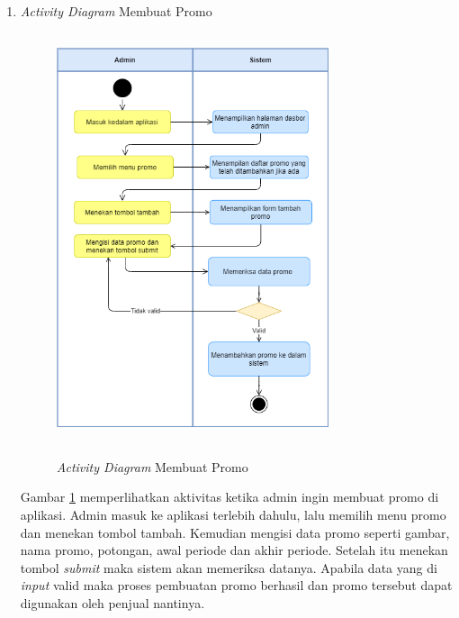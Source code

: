 \begin{enumerate}
	\newpage
	\item \textit{Activity Diagram} Membuat Promo
	\begin{figure}[H]
		\centering
		{\includegraphics [width = 8cm, height= 12cm]{gambar/activity diagram/buat promo}}
		\caption{\textit{Activity Diagram} Membuat Promo}
		\label{buat promo}
	\end{figure}
	\par Gambar \ref*{buat promo} memperlihatkan aktivitas ketika admin ingin membuat promo di aplikasi. Admin masuk ke aplikasi terlebih dahulu, lalu memilih menu promo dan menekan tombol tambah. Kemudian mengisi data promo seperti gambar, nama promo, potongan, awal periode dan akhir periode. Setelah itu menekan tombol \textit{submit} maka sistem akan memeriksa datanya. Apabila data yang di \textit{input} valid maka proses pembuatan promo berhasil dan promo tersebut dapat digunakan oleh penjual nantinya.


\end{enumerate}
